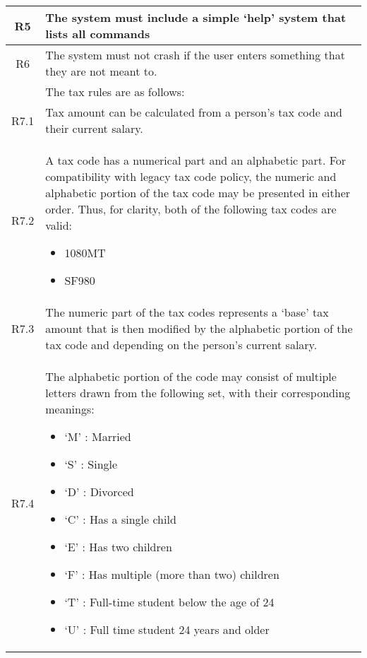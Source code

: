 \begin{table}[H]
\begin{tabularx}{\textwidth}{| c | X |}
	\hline %
	R5 & The system must include a simple ‘help’ system that lists all commands \\
	\hline %
	R6 & The system must not crash if the user enters something that they are not meant to. \\
	\hline %
	& The tax rules are as follows:\\
	\hline %
	R7.1 & Tax amount can be calculated from a person’s tax code and their current salary. \\
	\hline %
	R7.2 & A tax code has a numerical part and an alphabetic part. For compatibility with legacy
	tax code policy, the numeric and alphabetic portion of the tax code may be presented in either order. Thus, for clarity, both of the following tax codes are valid:
	\begin{itemize}[itemsep=\tableitemsep, leftmargin=\tableleftsep]
	\item 1080MT
	\item SF980
\end{itemize}
	\\
	\hline %
	R7.3 & The numeric part of the tax codes represents a ‘base’ tax amount that is then modified by the alphabetic portion of the tax code and depending on the person’s current salary. \\
	\hline %
    R7.4 & The alphabetic portion of the code may consist of multiple letters drawn from the following set, with their corresponding meanings: 
    \begin{itemize}[itemsep=\tableitemsep, leftmargin=\tableleftsep]
    \item ‘M’ : Married
    \item ‘S’ : Single
    \item ‘D’ : Divorced
    \item ‘C’ : Has a single child
    \item ‘E’ : Has two children
    \item ‘F’ : Has multiple (more than two) children 
    \item ‘T’ : Full-time student below the age of 24 
    \item ‘U’ : Full time student 24 years and older
\end{itemize}
	\\
	\hline %
	\end{tabularx}
	\end{table}


